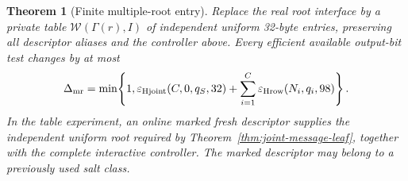 \documentclass[pdflatex]{sn-jnl}
\theoremstyle{thmstyleone}
\newtheorem{theorem}{Theorem}[section]
\theoremstyle{thmstylethree}
\theoremstyle{thmstyletwo}
\begin{document}
\begin{theorem}[Finite multiple-root entry]
\label{thm:multiple-root-entry}
Replace the real root interface by a private table
$\mathcal W(\Gamma(r),I)$ of independent uniform 32-byte entries, preserving
all descriptor aliases and the controller above. Every efficient available
output-bit test changes by at most
\begin{equation}
 \Delta_{\rm mr}=\min\!\left\{1,
 \varepsilon_{\rm Hjoint}(C,0,q_S,32)
 +\sum_{i=1}^{C}\varepsilon_{\rm Hrow}(N_i,q_i,98)\right\}.
 \label{eq:multiple-root-error}
\end{equation}
In the table experiment, an online marked fresh descriptor supplies the
independent uniform root required by
Theorem~\ref{thm:joint-message-leaf}, together with the complete interactive
controller. The marked descriptor may belong to a previously used salt class.
\end{theorem}
\end{document}

